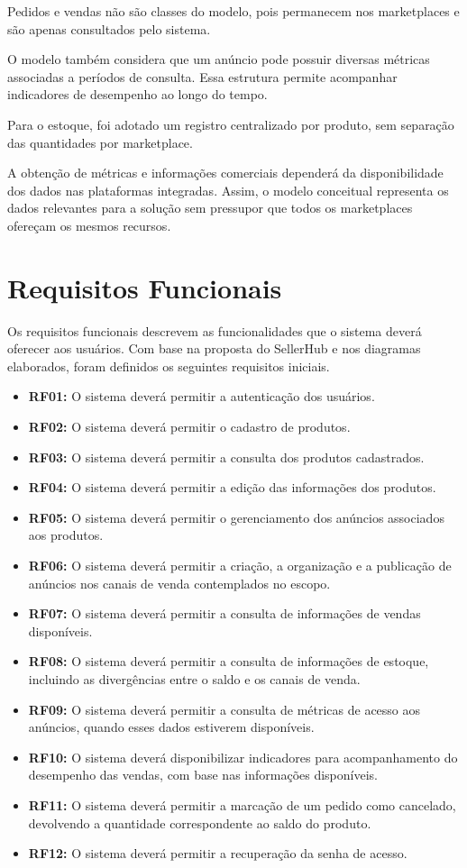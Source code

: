 Pedidos e vendas não são classes do modelo, pois permanecem nos marketplaces e são apenas consultados pelo sistema.

O modelo também considera que um anúncio pode possuir diversas métricas associadas a períodos de consulta. Essa estrutura permite acompanhar indicadores de desempenho ao longo do tempo.

Para o estoque, foi adotado um registro centralizado por produto, sem separação das quantidades por marketplace.

A obtenção de métricas e informações comerciais dependerá da disponibilidade dos dados nas plataformas integradas. Assim, o modelo conceitual representa os dados relevantes para a solução sem pressupor que todos os marketplaces ofereçam os mesmos recursos.

\section{Requisitos Funcionais}

Os requisitos funcionais descrevem as funcionalidades que o sistema deverá oferecer aos usuários. Com base na proposta do SellerHub e nos diagramas elaborados, foram definidos os seguintes requisitos iniciais.

\begin{itemize}
    \item \textbf{RF01:} O sistema deverá permitir a autenticação dos usuários.
    \item \textbf{RF02:} O sistema deverá permitir o cadastro de produtos.
    \item \textbf{RF03:} O sistema deverá permitir a consulta dos produtos cadastrados.
    \item \textbf{RF04:} O sistema deverá permitir a edição das informações dos produtos.
    \item \textbf{RF05:} O sistema deverá permitir o gerenciamento dos anúncios associados aos produtos.
    \item \textbf{RF06:} O sistema deverá permitir a criação, a organização e a publicação de anúncios nos canais de venda contemplados no escopo.
    \item \textbf{RF07:} O sistema deverá permitir a consulta de informações de vendas disponíveis.
    \item \textbf{RF08:} O sistema deverá permitir a consulta de informações de estoque, incluindo as divergências entre o saldo e os canais de venda.
    \item \textbf{RF09:} O sistema deverá permitir a consulta de métricas de acesso aos anúncios, quando esses dados estiverem disponíveis.
    \item \textbf{RF10:} O sistema deverá disponibilizar indicadores para acompanhamento do desempenho das vendas, com base nas informações disponíveis.
    \item \textbf{RF11:} O sistema deverá permitir a marcação de um pedido como cancelado, devolvendo a quantidade correspondente ao saldo do produto.
    \item \textbf{RF12:} O sistema deverá permitir a recuperação da senha de acesso.
\end{itemize}

